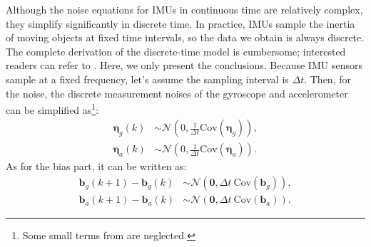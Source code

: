 Although the noise equations for IMUs in continuous time are relatively complex, they simplify significantly in discrete time. In practice, IMUs sample the inertia of moving objects at fixed time intervals, so the data we obtain is always discrete. The complete derivation of the discrete-time model is cumbersome; interested readers can refer to \cite{Crassidis2006}. Here, we only present the conclusions. Because IMU sensors sample at a fixed frequency, let's assume the sampling interval is $\Delta t$. Then, for the noise, the discrete measurement noises of the gyroscope and accelerometer can be simplified as\footnote{Some small terms from \cite{Crassidis2006} are neglected.}:
\begin{subequations}\label{eq:discrete-noise}
	\begin{align}
		\boldsymbol{\eta}_{g}(k) & \sim \mathcal{N}(0, \frac{1}{\Delta t}  \mathrm{Cov}(\boldsymbol{\eta}_g)),
		\\
		\boldsymbol{\eta}_{a}(k) & \sim \mathcal{N}(0,  \frac{1}{\Delta t} \mathrm{Cov}(\boldsymbol{\eta}_a)) .
	\end{align}
\end{subequations}
As for the bias part, it can be written as:
\begin{subequations}\label{eq:discrete-bias}
	\begin{align}
		\bm{b}_g(k+1) - \bm{b}_g(k) &\sim \mathcal{N}(\bm{0}, \Delta t \ \mathrm{Cov}(\bm{b}_g)), \\
		\bm{b}_a(k+1) - \bm{b}_a(k) &\sim \mathcal{N}(\bm{0}, \Delta t \ \mathrm{Cov}(\bm{b}_a)).
	\end{align}
\end{subequations}

